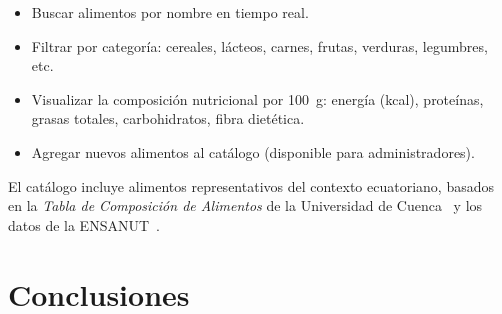 \documentclass[12pt,a4paper]{article}
\begin{document}
\begin{itemize}[leftmargin=1.5em]
  \item Buscar alimentos por nombre en tiempo real.
  \item Filtrar por categoría: cereales, lácteos, carnes, frutas, verduras, legumbres, etc.
  \item Visualizar la composición nutricional por 100~g: energía (kcal), proteínas,
        grasas totales, carbohidratos, fibra dietética.
  \item Agregar nuevos alimentos al catálogo (disponible para administradores).
\end{itemize}

El catálogo incluye alimentos representativos del contexto ecuatoriano, basados en
la \emph{Tabla de Composición de Alimentos} de la Universidad de Cuenca~\cite{ortiz2018}
y los datos de la ENSANUT~\cite{ensanut}.

\clearpage
\section{Conclusiones}
\end{document}
